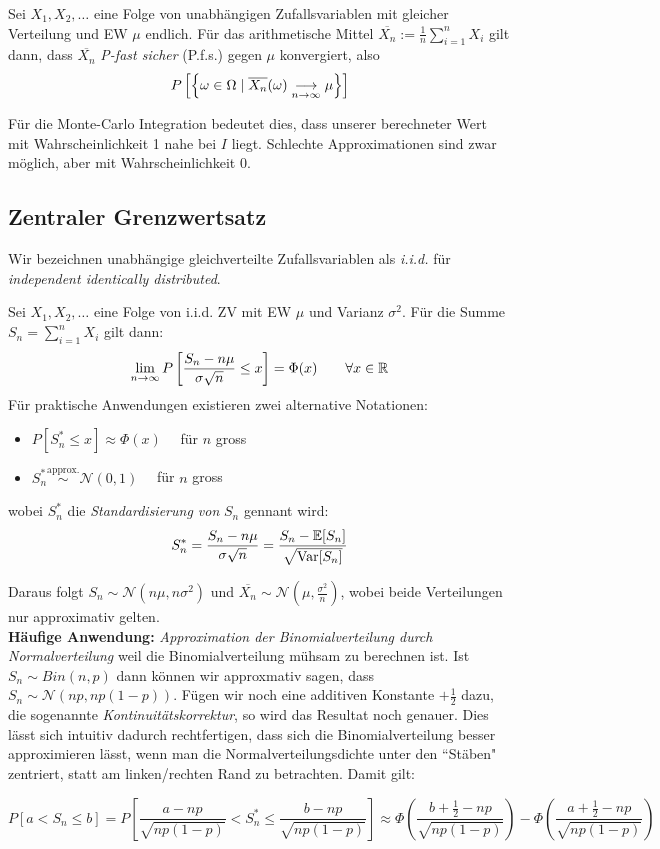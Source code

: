 \begin{satz}
Sei $X_1,X_2,\dots$ eine Folge von unabhängigen Zufallsvariablen mit gleicher Verteilung und EW $\mu$ endlich. Für das arithmetische Mittel $\overline{X_n} := \frac{1}{n} \sum_{i=1}^n X_i$ gilt dann, dass $\overline{X_n}$ \textit{P-fast sicher} (P.f.s.) gegen $\mu$ konvergiert, also
$$ P \left[ \left \{ \omega \in \Omega \;|\; \overline{X_n}(\omega) \underset{n\to\infty}{\longrightarrow} \mu \right \} \right] $$
\end{satz}
Für die Monte-Carlo Integration bedeutet dies, dass unserer berechneter Wert mit Wahrscheinlichkeit 1 nahe bei $I$ liegt. Schlechte Approximationen sind zwar möglich, aber mit Wahrscheinlichkeit 0.

\subsection{Zentraler Grenzwertsatz}
Wir bezeichnen unabhängige gleichverteilte Zufallsvariablen als \textit{i.i.d.} für \textit{independent identically distributed}.
\begin{satz}
Sei $X_1,X_2,\dots$ eine Folge von i.i.d. ZV mit EW $\mu$ und Varianz $\sigma^2$. Für die Summe $S_n = \sum_{i=1}^n X_i$ gilt dann:
$$ \lim_{n\to\infty} P\left[\frac{S_n - n\mu}{\sigma \sqrt{n}} \leq x \right] = \Phi(x) \quad \quad \forall x\in\mathbb{R}$$
Für praktische Anwendungen existieren zwei alternative Notationen:
\begin{itemize}
\item $P[S_n^* \leq x ] \approx \Phi(x) \quad$ für $n$ gross
\item $S_n^* \overset{\mbox{approx.}}{\sim} \mathcal{N}(0,1) \quad$ für $n$ gross
\end{itemize}
wobei $S_n^*$ die \textit{Standardisierung von} $S_n$ gennant wird:
$$ S_n^* = \frac{S_n - n\mu}{\sigma\sqrt{n}}= \frac{S_n - \mathbb{E}[S_n]}{\sqrt{\mathrm{Var}[S_n]}}$$
\end{satz}
Daraus folgt $S_n \sim \mathcal{N}(n\mu,n\sigma^2)$ und $\overline{X_n} \sim \mathcal{N}(\mu, \frac{\sigma^2}{n} )$, wobei beide Verteilungen nur approximativ gelten.\\

\textbf{Häufige Anwendung:} \textit{Approximation der Binomialverteilung durch Normalverteilung} weil die Binomialverteilung mühsam zu berechnen ist. Ist $S_n \sim Bin(n,p)$ dann können wir approxmativ sagen, dass $S_n \sim \mathcal{N}(np, np(1-p))$. Fügen wir noch eine additiven Konstante $+\frac{1}{2}$ dazu, die sogenannte \textit{Kontinuitätskorrektur}, so wird das Resultat noch genauer. Dies lässt sich intuitiv dadurch rechtfertigen, dass sich die Binomialverteilung besser approximieren lässt, wenn man die Normalverteilungsdichte unter den ``Stäben" zentriert, statt am linken/rechten Rand zu betrachten. Damit gilt:\\
\begin{korollar}
$$ P[a <  S_n \leq b] = P \left[ \frac{a-np}{\sqrt{np(1-p)}} < S_n^* \leq \frac{b-np}{\sqrt{np(1-p)}} \right] \approx \Phi \left(\frac{b+\frac{1}{2}-np}{\sqrt{np(1-p)}}\right) - \Phi \left( \frac{a+\frac{1}{2}-np}{\sqrt{np(1-p)}} \right)$$
\end{korollar}

